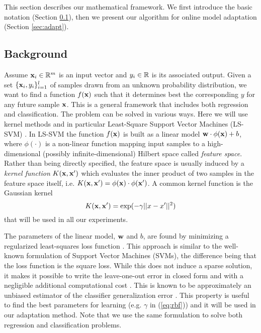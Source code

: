 This section describes our mathematical framework. We first introduce
the basic notation (Section \ref{sec:back}), then we present our algorithm
for online model adaptation (Section \ref{sec:adapt}).

\subsection{Background}
\label{sec:back}

Assume $\mathbf{x}_i \in \mathbb{R}^m$ is an input vector and $y_i \in \mathbb{R}$ is its
associated output.  Given a set $\{\mathbf{x}_i,y_i\}_{i=1}^l$ of samples
drawn from an unknown probability distribution, we want to find a
function $f(\mathbf{x})$ such that it determines best
the corresponding 
$y$ for any future sample $\mathbf{x}$.
This is a general framework that includes both regression and
classification.  The problem can be solved in various
ways. Here we will use kernel methods and in particular Least-Square
Support Vector Machines (LS-SVM) \cite{Cristianini00}. In LS-SVM the
function $f(\mathbf{x})$ is built as a linear model $\mathbf{w} \cdot \phi(\mathbf{x}) +
b$, where $\phi(\cdot)$ is a non-linear function mapping input samples
to a high-dimensional (possibly infinite-dimensional) Hilbert space
called \emph{feature space}. Rather than being directly specified, the
feature space is usually induced by a \emph{kernel function}
$K(\mathbf{x},\mathbf{x}')$ which evaluates the inner product of two samples in the
feature space itself,
i.e. $K(\mathbf{x},\mathbf{x}')=\phi(\mathbf{x}) \cdot \phi(\mathbf{x}')$. A common kernel
function is the Gaussian kernel
\begin{equation}
  K(\mathbf{x},\mathbf{x}')=\exp(-\gamma ||x-x'||^2)
  \label{eq:rbf}
\end{equation}
\noindent that will be used in all our experiments.

The parameters of the linear model, $\mathbf{w}$ and $b$, are found by
minimizing a regularized least-squares loss function
\cite{Cristianini00}. This approach is similar to the well-known
formulation of Support Vector Machines (SVMs), the difference being
that the loss function is the square loss.
While this does not induce a sparse solution,
it makes it possible to write the leave-one-out error in closed form and with a negligible additional computational cost \cite{Rifkin07}. This is known to be approximately an unbiased
estimator of the classifier generalization error \cite{LuntzB69}. This
property is useful to find the best parameters for learning
(e.g. $\gamma$ in (\ref{eq:rbf})) and it will be used in our
adaptation method. Note that we use the same formulation to solve both
regression and classification problems.

